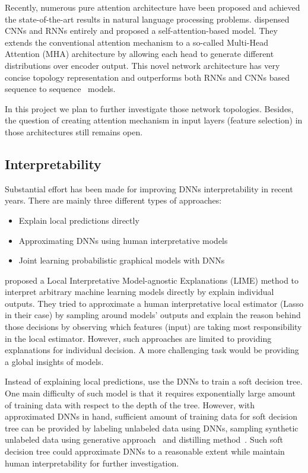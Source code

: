 \message{ !name(usyd_phd_proposal.tex)}\documentclass{article} \usepackage{tabularx}
\renewcommand{\citename}{\citet} \renewcommand{\cite}{\citep}
\begin{document}
Recently, numerous pure attention architecture have been proposed
and achieved the state-of-the-art results in natural language
processing problems. \citename{vaswani2017attention} dispensed
CNNs and RNNs entirely and proposed a self-attention-based model.
They extends the conventional attention mechanism to a so-called
Multi-Head Attention (MHA) architecture by allowing each head to
generate different distributions over encoder output. This novel
network architecture has very concise topology representation and
outperforms both RNNs and CNNs based sequence to
sequence~\cite{vaswani2017attention} models.

In this project we plan to further investigate those network
topologies. Besides, the question of creating attention mechanism
in input layers (feature selection) in those architectures still
remains open.

\subsection{Interpretability}
\label{sec:interp}

Substantial effort has been made for improving DNNs
interpretability in recent years. There are mainly three
different types of approaches:

\begin{itemize}
\item Explain local predictions directly
\item Approximating DNNs using human interpretative models
\item Joint learning probabilistic graphical models with DNNs
\end{itemize}

\citename{ribeiro2016should} proposed a Local Interpretative
Model-agnostic Explanations (LIME) method to interpret arbitrary
machine learning models directly by explain individual outputs.
They tried to approximate a human interpretative local estimator
(Lasso in their case) by sampling around models' outputs and
explain the reason behind those decisions by observing which
features (input) are taking most responsibility in the local
estimator. However, such approaches are limited to providing
explanations for individual decision. A more challenging task
would be providing a global insights of models.

Instead of explaining local predictions, \citename{SDT} use the
DNNs to train a soft decision tree. One main difficulty of such
model is that it requires exponentially large amount of training
data with respect to the depth of the tree. However, with
approximated DNNs in hand, sufficient amount of training data for
soft decision tree can be provided by labeling unlabeled data
using DNNs, sampling synthetic unlabeled data using generative
approach~\cite{goodfellow2014generative} and distilling
method~\cite{hinton2015distilling}. Such soft decision tree could
approximate DNNs to a reasonable extent while maintain human
interpretability for further investigation.
\end{document}
